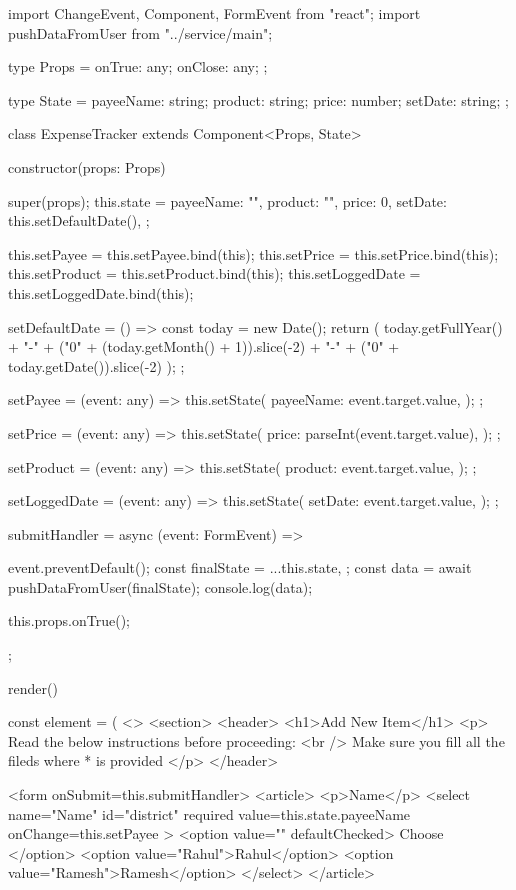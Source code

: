 import { ChangeEvent, Component, FormEvent } from "react";
import { pushDataFromUser } from "../service/main";

type Props = {
  onTrue: any;
  onClose: any;
};

type State = {
  payeeName: string;
  product: string;
  price: number;
  setDate: string;
};

class ExpenseTracker extends Component<Props, State> {
  constructor(props: Props) {
    super(props);
    this.state = {
      payeeName: "",
      product: "",
      price: 0,
      setDate: this.setDefaultDate(),
    };

    this.setPayee = this.setPayee.bind(this);
    this.setPrice = this.setPrice.bind(this);
    this.setProduct = this.setProduct.bind(this);
    this.setLoggedDate = this.setLoggedDate.bind(this);
  }

  setDefaultDate = () => {
    const today = new Date();
    return (
      today.getFullYear() +
      "-" +
      ("0" + (today.getMonth() + 1)).slice(-2) +
      "-" +
      ("0" + today.getDate()).slice(-2)
    );
  };

  setPayee = (event: any) => {
    this.setState({
      payeeName: event.target.value,
    });
  };

  setPrice = (event: any) => {
    this.setState({
      price: parseInt(event.target.value),
    });
  };

  setProduct = (event: any) => {
    this.setState({
      product: event.target.value,
    });
  };

  setLoggedDate = (event: any) => {
    this.setState({
      setDate: event.target.value,
    });
  };

  submitHandler = async (event: FormEvent) => {
    event.preventDefault();
    const finalState = {
      ...this.state,
    };
    const data = await pushDataFromUser(finalState);
    console.log(data);

    this.props.onTrue();
  };

  render() {
    const element = (
      <>
        <section>
          <header>
            <h1>Add New Item</h1>
            <p>
              Read the below instructions before proceeding:
              <br /> Make sure you fill all the fileds where * is provided
            </p>
          </header>

          <form onSubmit={this.submitHandler}>
            <article>
              <p>Name</p>
              <select
                name="Name"
                id="district"
                required
                value={this.state.payeeName}
                onChange={this.setPayee}
              >
                <option value="" defaultChecked>
                  Choose
                </option>
                <option value="Rahul">Rahul</option>
                <option value="Ramesh">Ramesh</option>
              </select>
            </article>

}}
